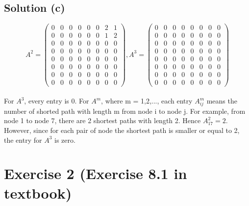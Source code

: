 \documentclass[12pt]{article}%
\begin{document}
\subsection{Solution (c)}
$$A^2 = \left(\begin{matrix} 
0&0&0&0&0&0&2&1
\\0&0&0&0&0&0&1&2
\\0&0&0&0&0&0&0&0
\\0&0&0&0&0&0&0&0
\\0&0&0&0&0&0&0&0
\\0&0&0&0&0&0&0&0
\\0&0&0&0&0&0&0&0
\\0&0&0&0&0&0&0&0
 \end{matrix}\right),
 A^3 = \left(\begin{matrix} 
0&0&0&0&0&0&0&0
\\0&0&0&0&0&0&0&0
\\0&0&0&0&0&0&0&0
\\0&0&0&0&0&0&0&0
\\0&0&0&0&0&0&0&0
\\0&0&0&0&0&0&0&0
\\0&0&0&0&0&0&0&0
\\0&0&0&0&0&0&0&0
 \end{matrix}\right)$$
 \\
 For $A^3$, every entry is 0. For $A^m$, where m = 1,2,..., each entry $A^m_{ij}$ means the number of shorted path with length m from node i to node j. For example, from node 1 to node 7, there are 2 shortest paths with length 2. Hence $A^2_{17}=2$. However, since for each pair of node the shortest path is smaller or equal to 2, the entry for $A^3$ is zero.
 
\section{Exercise 2 (Exercise 8.1 in textbook)}
\end{document}
